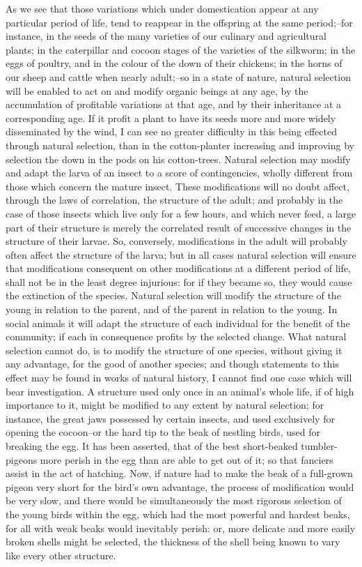 As we see that those variations which under domestication appear at any particular period of life, tend to reappear in the offspring at the same period;--for instance, in the seeds of the many varieties of our culinary and agricultural plants; in the caterpillar and cocoon stages of the varieties of the silkworm; in the eggs of poultry, and in the colour of the down of their chickens; in the horns of our sheep and cattle when nearly adult;--so in a state of nature, natural selection will be enabled to act on and modify organic beings at any age, by the accumulation of profitable variations at that age, and by their inheritance at a corresponding age. If it profit a plant to have its seeds more and more widely disseminated by the wind, I can see no greater difficulty in this being effected through natural selection, than in the cotton-planter increasing and improving by selection the down in the pods on his cotton-trees. Natural selection may modify and adapt the larva of an insect to a score of contingencies, wholly different from those which concern the mature insect. These modifications will no doubt affect, through the laws of correlation, the structure of the adult; and probably in the case of those insects which live only for a few hours, and which never feed, a large part of their structure is merely the correlated result of successive changes in the structure of their larvae. So, conversely, modifications in the adult will probably often affect the structure of the larva; but in all cases natural selection will ensure that modifications consequent on other modifications at a different period of life, shall not be in the least degree injurious: for if they became so, they would cause the extinction of the species.
Natural selection will modify the structure of the young in relation to the parent, and of the parent in relation to the young. In social animals it will adapt the structure of each individual for the benefit of the community; if each in consequence profits by the selected change. What natural selection cannot do, is to modify the structure of one species, without giving it any advantage, for the good of another species; and though statements to this effect may be found in works of natural history, I cannot find one case which will bear investigation. A structure used only once in an animal's whole life, if of high importance to it, might be modified to any extent by natural selection; for instance, the great jaws possessed by certain insects, and used exclusively for opening the cocoon--or the hard tip to the beak of nestling birds, used for breaking the egg. It has been asserted, that of the best short-beaked tumbler-pigeons more perish in the egg than are able to get out of it; so that fanciers assist in the act of hatching. Now, if nature had to make the beak of a full-grown pigeon very short for the bird's own advantage, the process of modification would be very slow, and there would be simultaneously the most rigorous selection of the young birds within the egg, which had the most powerful and hardest beaks, for all with weak beaks would inevitably perish: or, more delicate and more easily broken shells might be selected, the thickness of the shell being known to vary like every other structure.

